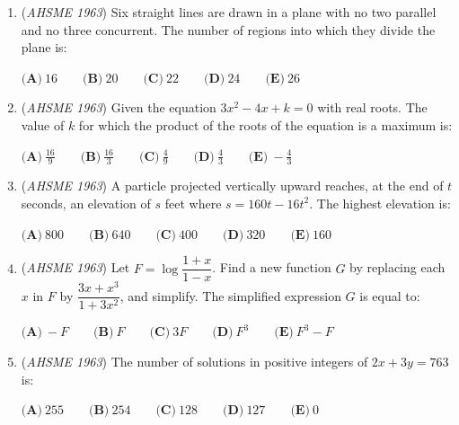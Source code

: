 \begin{enumerate}
 $\textbf{(A)}\ 0 \qquad \textbf{(B)}\ 1\qquad \textbf{(C)}\ 2 \qquad \textbf{(D)}\ 3 \qquad \textbf{(E)}\ 4$


 Version 2
Consider the statements (1) $p$ and $r$ are true and $q$ is false (2) $r$ is true and $p$ and $q$ are false (3) $p$ is true and $q$ and $r$ are false (4) $q$ and $r$ are true and $p$ is false. 
How many of these imply the truth of the statement
"$r$ is implied by the statement that $p$ implies $q$"?


 $\textbf{(A)}\ 0 \qquad \textbf{(B)}\ 1\qquad \textbf{(C)}\ 2 \qquad \textbf{(D)}\ 3 \qquad \textbf{(E)}\ 4$


	\item (\textit{AHSME 1963}) Six straight lines are drawn in a plane with no two parallel and no three concurrent. The number of regions into which they divide the plane is:


 $\textbf{(A)}\ 16 \qquad \textbf{(B)}\ 20\qquad \textbf{(C)}\ 22 \qquad \textbf{(D)}\ 24 \qquad \textbf{(E)}\ 26$


	\item (\textit{AHSME 1963}) Given the equation $3x^2 - 4x + k = 0$ with real roots. The value of $k$ for which the product of the roots of the equation is a maximum is:


 $\textbf{(A)}\ \frac{16}{9}\qquad \textbf{(B)}\ \frac{16}{3}\qquad \textbf{(C)}\ \frac{4}{9}\qquad \textbf{(D)}\ \frac{4}{3}\qquad \textbf{(E)}\ -\frac{4}{3}$


	\item (\textit{AHSME 1963}) A particle projected vertically upward reaches, at the end of $t$ seconds, an elevation of $s$ feet where $s = 160 t - 16t^2$. The highest elevation is:


 $\textbf{(A)}\ 800 \qquad \textbf{(B)}\ 640\qquad \textbf{(C)}\ 400 \qquad \textbf{(D)}\ 320 \qquad \textbf{(E)}\ 160$


	\item (\textit{AHSME 1963}) Let $F=\log\dfrac{1+x}{1-x}$. Find a new function $G$ by replacing each $x$ in $F$ by $\dfrac{3x+x^3}{1+3x^2}$, and simplify. 
The simplified expression $G$ is equal to:


 $\textbf{(A)}\ -F \qquad \textbf{(B)}\ F\qquad \textbf{(C)}\ 3F \qquad \textbf{(D)}\ F^3 \qquad \textbf{(E)}\ F^3-F$


	\item (\textit{AHSME 1963}) The number of solutions in positive integers of $2x+3y=763$ is:


 $\textbf{(A)}\ 255 \qquad \textbf{(B)}\ 254\qquad \textbf{(C)}\ 128 \qquad \textbf{(D)}\ 127 \qquad \textbf{(E)}\ 0$



\end{enumerate}
